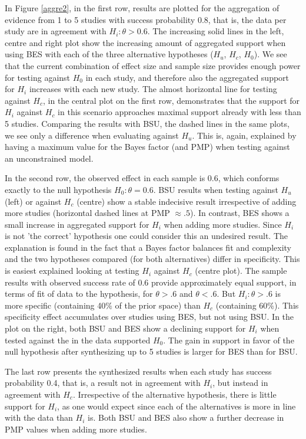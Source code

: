 \documentclass[11pt,reqno]{article}
\begin{document}
In Figure \ref{aggre2}, in the first row, results are plotted for the aggregation of evidence from 1 to 5 studies with success probability 0.8, that is, the data per study are in agreement with $H_i: \theta>0.6$. The increasing solid lines in the left, centre and right plot show the increasing amount of aggregated support when using BES with each of the three alternative hypotheses ($H_u$, $H_c$, $H_0$). We see that the current combination of effect size and sample size provides enough power for testing against $H_0$ in each study, and therefore also the aggregated support for $H_i$ increases with each new study. The almost horizontal line for testing against $H_c$, in the central plot on the first row, demonstrates that the support for $H_i$ against $H_c$ in this scenario approaches maximal support already with less than 5 studies.
Comparing the results with BSU, the dashed lines in the same plots, we see only a difference when evaluating against $H_u$. This is, again, explained by having a maximum value for the Bayes factor (and PMP) when testing against an unconstrained model.

In the second row, the observed effect in each sample is 0.6, which conforms exactly to the null hypothesis $H_0: \theta=0.6$. BSU results when testing against $H_u$ (left) or against $H_c$ (centre) show a stable indecisive result irrespective of adding more studies (horizontal dashed lines at PMP $\approx .5$). In contrast, BES shows a small increase in aggregated support for $H_i$ when adding more studies. Since $H_i$ is not 'the correct' hypothesis one could consider this an undesired result. The explanation is found in the fact that a Bayes factor balances fit and complexity and the two hypotheses compared (for both alternatives) differ in specificity. This is easiest explained looking at testing $H_i$ against $H_c$ (centre plot). The sample results with observed success rate of 0.6 provide approximately equal support, in terms of fit of data to the hypothesis, for $\theta>.6$ and $\theta<.6$. But $H_i: \theta>.6$ is more specific (containing 40$\%$ of the prior space) than $H_c$ (containing 60$\%$). This specificity effect accumulates over studies using BES, but not using BSU. In the plot on the right, both BSU and BES show a declining support for $H_i$ when tested against the in the data supported $H_0$. The gain in support in favor of the null hypothesis after synthesizing up to 5 studies is larger for BES than for BSU.

The last row presents the synthesized results when each study has success probability 0.4, that is, a result not in agreement with $H_i$, but instead in agreement with $H_c$. Irrespective of the alternative hypothesis, there is little support for $H_i$, as one would expect since each of the alternatives is more in line with the data than $H_i$ is. Both BSU and BES also show a further decrease in PMP values when adding more studies.
\end{document}
